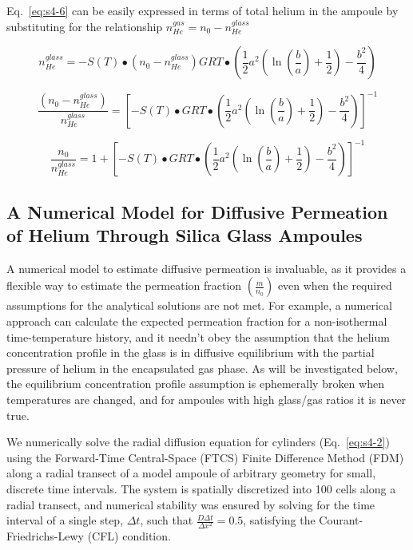 Eq.~\eqref{eq:s4-6} can be easily expressed in terms of total helium in the ampoule
by substituting for the relationship
\(n_{He}^{gas} = n_{0} - n_{He}^{glass}\)

\[n_{He}^{glass} = - S(T) \bullet \left( n_{0} - n_{He}^{glass} \right)GRT \bullet \left( \frac{1}{2}a^{2}\left( \ln\left( \frac{b}{a} \right) + \frac{1}{2} \right) - \frac{b^{2}}{4} \right)\]

\[\frac{\left( n_{0} - n_{He}^{glass} \right)}{n_{He}^{glass}} = \left\lbrack - S(T) \bullet GRT \bullet \left( \frac{1}{2}a^{2}\left( \ln\left( \frac{b}{a} \right) + \frac{1}{2} \right) - \frac{b^{2}}{4} \right) \right\rbrack^{- 1}\]

\begin{equation}
\frac{n_{0}}{n_{He}^{glass}} = 1 + \left\lbrack - S(T) \bullet GRT \bullet \left( \frac{1}{2}a^{2}\left( \ln\left( \frac{b}{a} \right) + \frac{1}{2} \right) - \frac{b^{2}}{4} \right) \right\rbrack^{- 1}
\label{eq:s4-7}
\end{equation}

\subsection{A Numerical Model for Diffusive Permeation of Helium Through
Silica Glass
Ampoules}\label{a-numerical-model-for-diffusive-permeation-of-helium-through-silica-glass-ampoules}

A numerical model to estimate diffusive permeation is invaluable, as it
provides a flexible way to estimate the permeation fraction
\(\left( \frac{m}{n_{0}} \right)\) even when the required assumptions
for the analytical solutions are not met. For example, a numerical
approach can calculate the expected permeation fraction for a
non-isothermal time-temperature history, and it needn't obey the
assumption that the helium concentration profile in the glass is in
diffusive equilibrium with the partial pressure of helium in the
encapsulated gas phase. As will be investigated below, the equilibrium
concentration profile assumption is ephemerally broken when temperatures
are changed, and for ampoules with high glass/gas ratios it is never
true.

We numerically solve the radial diffusion equation for cylinders (Eq.~\eqref{eq:s4-2}) using the Forward-Time Central-Space (FTCS) Finite Difference
Method (FDM) along a radial transect of a model ampoule of arbitrary
geometry for small, discrete time intervals. The system is spatially
discretized into 100 cells along a radial transect, and numerical
stability was ensured by solving for the time interval of a single step,
$\Delta t$, such that \(\frac{D\Delta t}{\Delta x^{2}} = 0.5\), satisfying the
Courant-Friedrichs-Lewy (CFL) condition.

